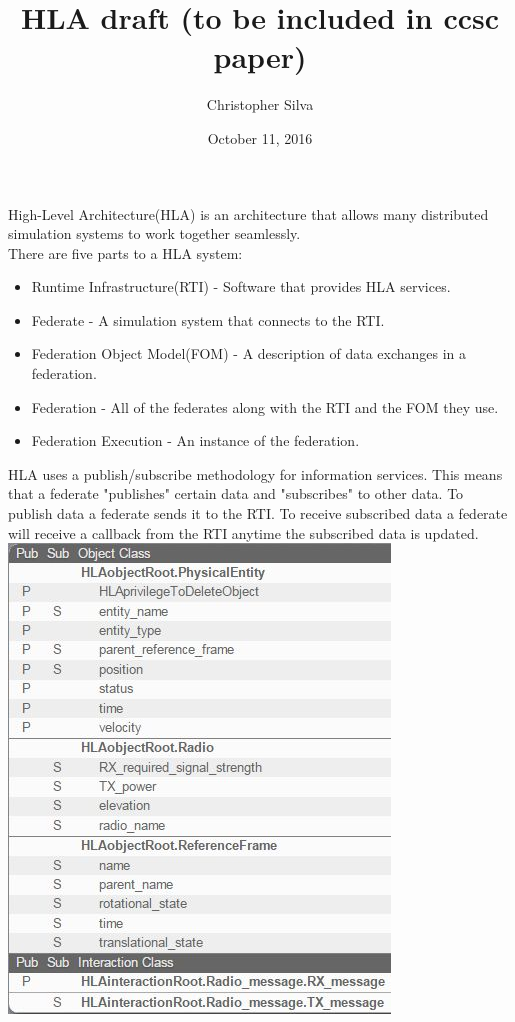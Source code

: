\documentclass{article}
\title{HLA draft (to be included in ccsc paper)}
\date{October 11, 2016}
\author{Christopher Silva}
\begin{document}
	\maketitle
	\newpage
	\begin{multicols}{2}
		High-Level Architecture(HLA) is an architecture that allows many distributed simulation systems to work together seamlessly. \\
		There are five parts to a HLA system:
		\begin{itemize}
			\item Runtime Infrastructure(RTI) - Software that provides HLA services.
			\item Federate - A simulation system that connects to the RTI.
			\item Federation Object Model(FOM) - A description of data exchanges in a federation.
			\item Federation - All of the federates along with the RTI and the FOM they use.
			\item Federation Execution - An instance of the federation.
		\end{itemize}
		HLA uses a publish/subscribe methodology for information services. This means that a federate "publishes" certain data and "subscribes" to other data. To publish data a federate sends it to the RTI. To receive subscribed data a federate will receive a callback from the RTI anytime the subscribed data is updated. \\
		
		\label{interactions}
		\includegraphics[width=\columnwidth]{interactions.png}
		

\end{multicols}
\end{document}
